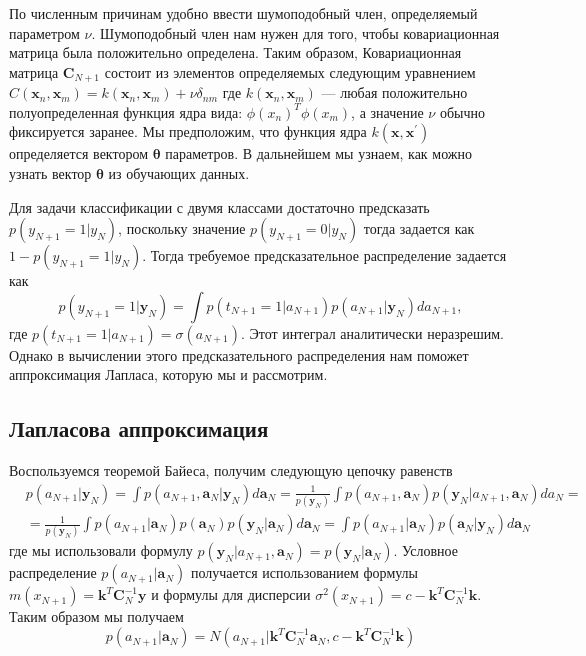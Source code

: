 По численным причинам удобно ввести шумоподобный член, определяемый
параметром $\nu$. Шумоподобный член нам нужен для того, чтобы ковариационная матрица была положительно определена. Таким образом,
Ковариационная матрица $\mathbf{C}_{N+1}$ состоит из элементов определяемых следующим уравнением $C(\mathbf{x}_n,\mathbf{x}_m)=k(\mathbf{x}_n,\mathbf{x}_m)+\nu\delta_{nm}$
где $k(\mathbf{x}_n,\mathbf{x}_m)$ — любая положительно полуопределенная функция ядра вида: $\phi(x_n)^T\phi(x_m)$, а значение $\nu$ обычно фиксируется заранее. Мы предположим, что
функция ядра $k(\mathbf{x},\mathbf{x}^{\prime})$ определяется вектором $\mathbf{\theta}$ параметров. В дальнейшем мы узнаем, как можно узнать вектор $\mathbf{\theta}$ из обучающих данных.

Для задачи классификации с двумя классами достаточно предсказать $p(y_{N+1} =1|y_{N})$, поскольку
значение $p(y_{N+1} =0|y_{N})$ тогда задается как $1-p(y_{N+1} =1|y_{N})$. Тогда требуемое
предсказательное распределение задается как
\begin{equation}
p(y_{N+1} =1|\mathbf{y}_{N})= \int p(t_{N+1} =1|a_{N+1})p(a_{N+1}|\mathbf{y}_N)da_{N+1},
\end{equation}
где $p(t_{N+1} =1|a_{N+1})=\sigma(a_{N+1})$. Этот интеграл аналитически неразрешим. Однако в вычислении этого предсказательного распределения нам поможет аппроксимация Лапласа, которую мы и рассмотрим.

\subsection{Лапласова аппроксимация}
Воспользуемся теоремой Байеса, получим следующую цепочку равенств
\begin{equation}
\label{integral}
\begin{split}
&p(a_{N+1}|\mathbf{y}_{N}) = \int p(a_{N+1},\mathbf{a}_{N}|\mathbf{y}_N)d\mathbf{a}_{N}
= \frac{1}{p(\mathbf{y}_N)} \int p(a_{N+1},\mathbf{a}_{N})p(\mathbf{y}_{N}|a_{N+1},\mathbf{a}_{N})da_{N}= \\
&=\frac{1}{p(\mathbf{y}_{N})} \int p(a_{N+1}|\mathbf{a}_{N})p(\mathbf{a}_{N})p(\mathbf{y}_{N}|\mathbf{a}_{N})d\mathbf{a}_{N}= \int p(a_{N+1}|\mathbf{a}_{N})p(\mathbf{a}_{N}|\mathbf{y}_{N})d\mathbf{a}_{N}
\end{split}
\end{equation}
где мы использовали формулу $p(\mathbf{y}_{N}|a_{N+1},\mathbf{a}_{N})=p(\mathbf{y}_{N}|\mathbf{a}_{N})$. 
Условное распределение $p(a_{N+1}|\mathbf{a}_{N})$ получается использованием формулы  $m(x_{N+1}) = \mathbf{k}^T\mathbf{C}^{-1}_N\mathbf{y}$ и формулы для дисперсии $\sigma^2(x_{N+1}) = c-\mathbf{k}^T\mathbf{C}^{-1}_N\mathbf{k}$. Таким образом мы получаем
\[
\label{condition}
p(a_{N+1}|\mathbf{a}_{N})=N(a_{N+1}|\mathbf{k}^T\mathbf{C}^
{-1}_N\mathbf{a}_{N},c-\mathbf{k}^T\mathbf{C}^{-1}_N\mathbf{k})\]

